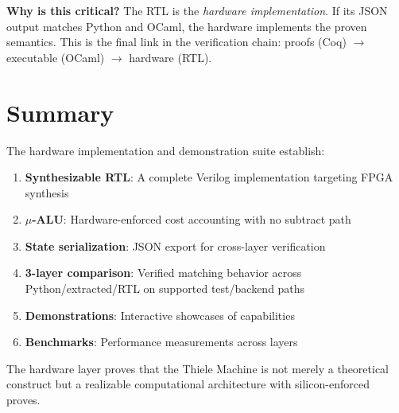 \textbf{Why is this critical?} The RTL is the \textit{hardware implementation}. If its JSON output matches Python and OCaml, the hardware implements the proven semantics. This is the final link in the verification chain: proofs (Coq) $\rightarrow$ executable (OCaml) $\rightarrow$ hardware (RTL).


\section{Summary}


The hardware implementation and demonstration suite establish:
\begin{enumerate}
    \item \textbf{Synthesizable RTL}: A complete Verilog implementation targeting FPGA synthesis
    \item \textbf{$\mu$-ALU}: Hardware-enforced cost accounting with no subtract path
    \item \textbf{State serialization}: JSON export for cross-layer verification
    \item \textbf{3-layer comparison}: Verified matching behavior across Python/extracted/RTL on supported test/backend paths
    \item \textbf{Demonstrations}: Interactive showcases of capabilities
    \item \textbf{Benchmarks}: Performance measurements across layers
\end{enumerate}

The hardware layer proves that the Thiele Machine is not merely a theoretical construct but a realizable computational architecture with silicon-enforced proves.
